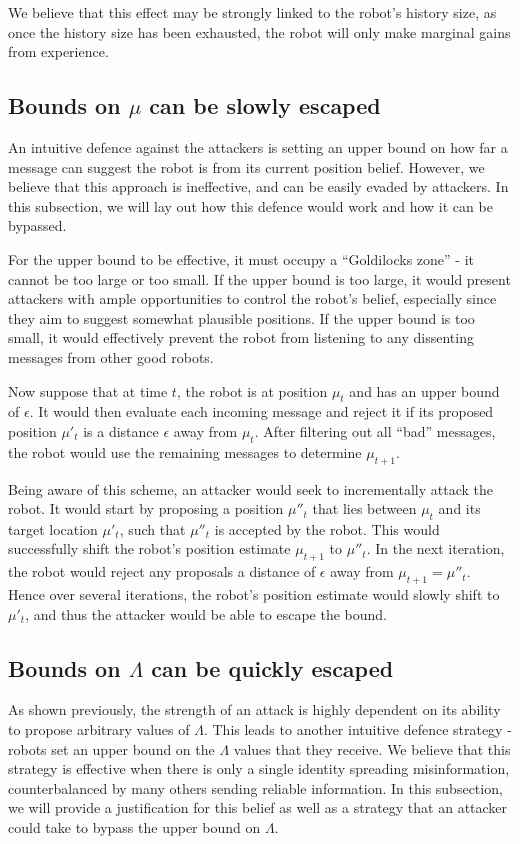 We believe that this effect may be strongly linked to the robot's history size, as once the history size has been exhausted, the robot will only make marginal gains from experience.

\subsection{Bounds on $\mu$ can be slowly escaped} \label{hyp:mu_bound}
An intuitive defence against the attackers is setting an upper bound on how far a message can suggest the robot is from its current position belief. 
However, we believe that this approach is ineffective, and can be easily evaded by attackers. In this subsection, we will lay out how this defence would work and how it can be bypassed.

For the upper bound to be effective, it must occupy a ``Goldilocks zone'' - it cannot be too large or too small. If the upper bound is too large, it would present attackers with ample opportunities to control the robot's belief, especially since they aim to suggest somewhat plausible positions.
If the upper bound is too small, it would effectively prevent the robot from listening to any dissenting messages from other good robots.

Now suppose that at time $t$, the robot is at position $\mu_t$ and has an upper bound of $\epsilon$. It would then evaluate each incoming message and reject it if its proposed position $\mu'_t$ is a distance $\epsilon$ away from $\mu_t$. After filtering out all ``bad'' messages, the robot would use the remaining messages to determine $\mu_{t+1}$. 

Being aware of this scheme, an attacker would seek to incrementally attack the robot. It would start by proposing a position $\mu''_t$ that lies between $\mu_t$ and its target location $\mu'_t$, such that $\mu''_t$ is accepted by the robot. This would successfully shift the robot's position estimate $\mu_{t+1}$ to $\mu''_t$. In the next iteration, the robot would reject any proposals a distance of $\epsilon$ away from $\mu_{t+1} = \mu''_t$. Hence over several iterations, the robot's position estimate would slowly shift to $\mu'_t$, and thus the attacker would be able to escape the bound.

\subsection{Bounds on $\Lambda$ can be quickly escaped} \label{hyp:sybils}
As shown previously, the strength of an attack is highly dependent on its ability to propose arbitrary values of $\Lambda$. This leads to another intuitive defence strategy - robots set an upper bound on the $\Lambda$ values that they receive. We believe that this strategy is effective when there is only a single identity spreading misinformation, counterbalanced by many others sending reliable information. In this subsection, we will provide a justification for this belief as well as a strategy that an attacker could take to bypass the upper bound on $\Lambda$.


